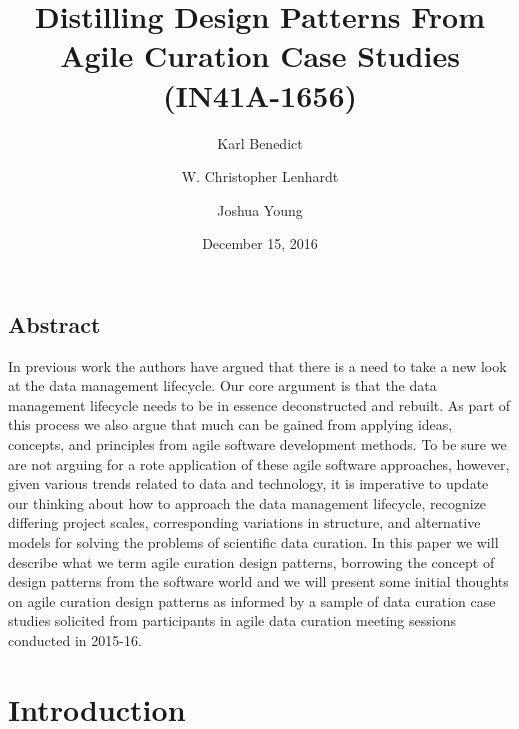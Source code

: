 \documentclass[final]{beamer}
\title
[American Geophysical Union Annual Meeting. San Francisco, CA. December
12-16, 2016.] %
{ %
Distilling Design Patterns From Agile Curation Case Studies (IN41A-1656)
}
\author{ %
Karl Benedict\inst{1} \and W. Christopher Lenhardt\inst{2} \and Joshua Young\inst{3}}
\institute{
\inst{1} University of New Mexico
\inst{2} Renaissance Computing Institute
\inst{3} University Corporation for Atmospheric Research
}
\date{December 15, 2016}
\begin{document}
\begin{frame}[t]
\begin{multicols}{3}


\subsection{Abstract}

In previous work the authors have argued that there is a need to take a
new look at the data management lifecycle. Our core argument is that the
data management lifecycle needs to be in essence deconstructed and
rebuilt. As part of this process we also argue that much can be gained
from applying ideas, concepts, and principles from agile software
development methods. To be sure we are not arguing for a rote
application of these agile software approaches, however, given various
trends related to data and technology, it is imperative to update our
thinking about how to approach the data management lifecycle, recognize
differing project scales, corresponding variations in structure, and
alternative models for solving the problems of scientific data curation.
In this paper we will describe what we term agile curation design
patterns, borrowing the concept of design patterns from the software
world and we will present some initial thoughts on agile curation design
patterns as informed by a sample of data curation case studies solicited
from participants in agile data curation meeting sessions conducted in
2015-16.






\section{Introduction}\label{introduction}


\end{multicols}
\end{frame}
\end{document}

